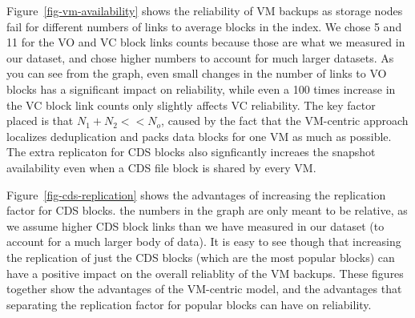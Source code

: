 Figure~\ref{fig-vm-availability} shows the reliability of VM backups as storage
nodes fail for different numbers of links to average blocks in the index. We
chose 5 and 11 for the VO and VC block links counts because those are what we
measured in our dataset, and chose higher numbers to account for much larger
datasets. As you can see from the graph, even small changes in the number of
links to VO blocks has a significant impact on reliability, while even a 100
times increase in the VC block link counts only slightly affects VC
reliability.  The key factor placed is that  $N_1 +N_2 << N_o$, caused by the
fact that the VM-centric approach localizes deduplication and packs  data
blocks for one VM as much as possible.  The extra replicaton for CDS blocks
also signficantly increaes the snapshot availability even when a CDS file block
is shared by every VM.

Figure~\ref{fig-cds-replication}
shows the advantages of increasing the replication factor for CDS blocks. the
numbers in the graph are only meant to be relative, as we assume higher CDS
block links than we have measured in our dataset (to account for a much larger
body of data). It is easy to see though that increasing the replication of just
the CDS blocks (which are the most popular blocks) can have a positive impact
on the overall reliablity of the VM backups. These figures together show the
advantages of the VM-centric model, and the advantages that separating the
replication factor for popular blocks can have on reliability.


